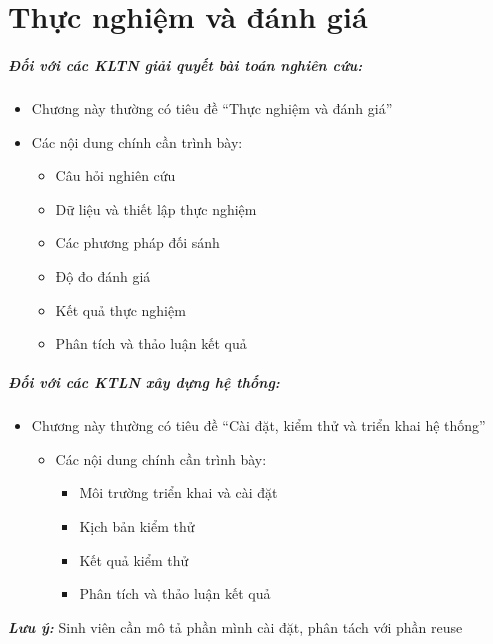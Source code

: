 \chapter{Thực nghiệm và đánh giá}
\label{chap:experiment}
\paragraph{Đối với các KLTN giải quyết bài toán nghiên cứu:}

\begin{itemize}
    \item Chương này thường có tiêu đề ``Thực nghiệm và đánh giá''
    \item Các nội dung chính cần trình bày:
    \begin{itemize}
        \item Câu hỏi nghiên cứu
        \item Dữ liệu và thiết lập thực nghiệm
        \item Các phương pháp đối sánh
        \item Độ đo đánh giá
        \item Kết quả thực nghiệm
        \item Phân tích và thảo luận kết quả
    \end{itemize}
\end{itemize}


\paragraph{Đối với các KTLN xây dựng hệ thống:}

\begin{itemize}
    \item Chương này thường có tiêu đề ``Cài đặt, kiểm thử và triển khai hệ thống''
    \begin{itemize}
        \item Các nội dung chính cần trình bày:
        \begin{itemize}
            \item Môi trường triển khai và cài đặt
            \item Kịch bản kiểm thử
            \item Kết quả kiểm thử
            \item Phân tích và thảo luận kết quả
        \end{itemize}
    \end{itemize}
\end{itemize}

\textit{\textbf{Lưu ý:}} Sinh viên cần mô tả phần mình cài đặt, phân tách với phần reuse